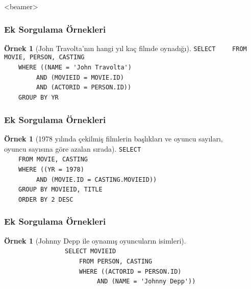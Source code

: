 \documentclass[dvipsnames]{beamer}
\theoremstyle{definition}
\theoremstyle{example}
\newtheorem{ornek}[theorem]{Örnek}
\theoremstyle{plain}
\begin{document}
\mode
<beamer>

\begin{frame}[fragile]
  \frametitle{Ek Sorgulama Örnekleri}

  \begin{ornek}[John Travolta'nın hangi yıl kaç filmde oynadığı]
\lstinline!SELECT! 
~~~~\lstinline!FROM MOVIE, PERSON, CASTING!\\
\pause
~~~~\lstinline!WHERE ((NAME = 'John Travolta')!\\
~~~~~~~~~\lstinline!AND (MOVIEID = MOVIE.ID)!\\
~~~~~~~~~\lstinline!AND (ACTORID = PERSON.ID))!\\
\pause
~~~~\lstinline!GROUP BY YR!
  \end{ornek}
\end{frame}

\begin{frame}[fragile]
  \frametitle{Ek Sorgulama Örnekleri}

  \begin{ornek}[1978 yılında çekilmiş filmlerin başlıkları ve oyuncu sayıları,\\
                oyuncu sayısına göre azalan sırada]
\lstinline!SELECT! \\
~~~~\lstinline!FROM MOVIE, CASTING!\\
\pause
~~~~\lstinline!WHERE ((YR = 1978)!\\
~~~~~~~~~\lstinline!AND (MOVIE.ID = CASTING.MOVIEID))!\\
\pause
~~~~\lstinline!GROUP BY MOVIEID, TITLE!\\
\pause\pause
~~~~\lstinline!ORDER BY 2 DESC!
  \end{ornek}
\end{frame}

\begin{frame}[fragile]
  \frametitle{Ek Sorgulama Örnekleri}

  \begin{ornek}[Johnny Depp ile oynamış oyuncuların isimleri]
~~~~~~~~~~~~~~~~~\lstinline!SELECT MOVIEID!\\
~~~~~~~~~~~~~~~~~~~~~\lstinline!FROM PERSON, CASTING!\\
~~~~~~~~~~~~~~~~~~~~~\lstinline!WHERE ((ACTORID = PERSON.ID)!\\
~~~~~~~~~~~~~~~~~~~~~~~~~~\lstinline!AND (NAME = 'Johnny Depp'))!\\
  \end{ornek}
\end{frame}
\end{document}
